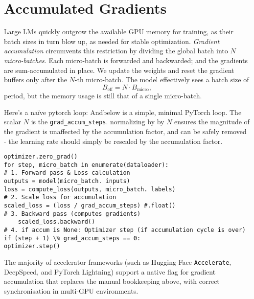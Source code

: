\section{Accumulated Gradients}\label{sec:gradacc}

Large LMs quickly outgrow the available GPU memory for training, as their batch sizes in turn blow up, as needed for stable optimization. \emph{Gradient accumulation} circumvents this restriction by dividing the global batch into \(N\) \emph{micro-batches}. Each micro-batch is forwarded and backwarded; and the gradients are sum-accumulated in place. We update the weights and reset the gradient buffers only after the \(N\)-th micro-batch. The model effectively sees a batch size of
\[
B_{\mathrm{eff}}=N \cdot B_{\mathrm{micro}},
\]
period, but the memory usage is still that of a single micro-batch.

Here’s a naïve pytorch loop: Andbelow is a simple, minimal PyTorch loop. The scalar \(N\) is the \texttt{grad\_accum\_steps}. normalizing by by \(N\) ensures the magnitude of the gradient is unaffected by the accumulation factor, and can be safely removed - the learning rate should simply be rescaled by the accumulation factor.

\begin{verbatim}
optimizer.zero_grad()
for step, micro_batch in enumerate(dataloader):
# 1. Forward pass & Loss calculation
outputs = model(micro_batch. inputs)
loss = compute_loss(outputs, micro_batch. labels)
# 2. Scale loss for accumulation
scaled_loss = (loss / grad_accum_steps) #.float() 
# 3. Backward pass (computes gradients)
    scaled_loss.backward()
# 4. if accum is None: Optimizer step (if accumulation cycle is over)
if (step + 1) \% grad_accum_steps == 0:
optimizer.step() 
\end{verbatim}

The majority of accelerator frameworks (such as Hugging Face \texttt{Accelerate}, DeepSpeed, and PyTorch Lightning) support a native flag for gradient accumulation that replaces the manual bookkeeping above, with correct synchronisation in multi-GPU environments.